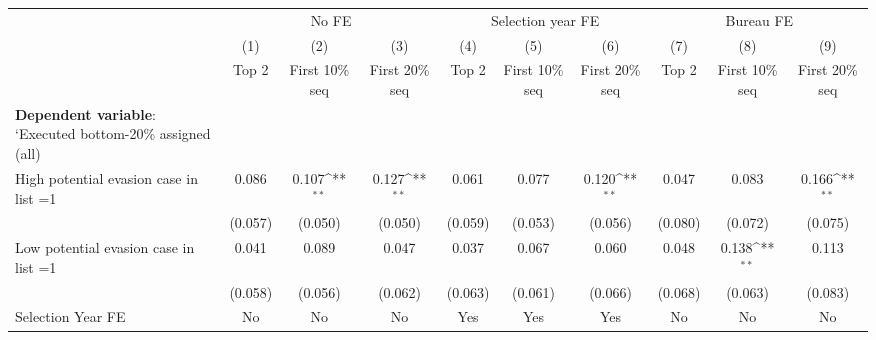 {
\def\sym#1{\ifmmode^{#1}\else\(^{#1}\)\fi}
\begin{tabular}{l*{9}{c}}
\toprule
            &\multicolumn{3}{c}{No FE}                                        &\multicolumn{3}{c}{Selection year FE}                            &\multicolumn{3}{c}{Bureau FE}                                    \\\cmidrule(lr){2-4}\cmidrule(lr){5-7}\cmidrule(lr){8-10}
            &\multicolumn{1}{c}{(1)}&\multicolumn{1}{c}{(2)}&\multicolumn{1}{c}{(3)}&\multicolumn{1}{c}{(4)}&\multicolumn{1}{c}{(5)}&\multicolumn{1}{c}{(6)}&\multicolumn{1}{c}{(7)}&\multicolumn{1}{c}{(8)}&\multicolumn{1}{c}{(9)}\\
            &\multicolumn{1}{c}{Top 2}&\multicolumn{1}{c}{First 10\% seq}&\multicolumn{1}{c}{First 20\% seq}&\multicolumn{1}{c}{Top 2}&\multicolumn{1}{c}{First 10\% seq}&\multicolumn{1}{c}{First 20\% seq}&\multicolumn{1}{c}{Top 2}&\multicolumn{1}{c}{First 10\% seq}&\multicolumn{1}{c}{First 20\% seq}\\
\midrule
\textbf{Dependent variable}: `Executed bottom-20\% \/ assigned (all)&                     &                     &                     &                     &                     &                     &                     &                     &                     \\
\addlinespace
High potential evasion case in list =1&       0.086         &       0.107\sym{**} &       0.127\sym{**} &       0.061         &       0.077         &       0.120\sym{**} &       0.047         &       0.083         &       0.166\sym{**} \\
            &     (0.057)         &     (0.050)         &     (0.050)         &     (0.059)         &     (0.053)         &     (0.056)         &     (0.080)         &     (0.072)         &     (0.075)         \\
\addlinespace
Low potential evasion case in list =1&       0.041         &       0.089         &       0.047         &       0.037         &       0.067         &       0.060         &       0.048         &       0.138\sym{**} &       0.113         \\
            &     (0.058)         &     (0.056)         &     (0.062)         &     (0.063)         &     (0.061)         &     (0.066)         &     (0.068)         &     (0.063)         &     (0.083)         \\
\midrule
Selection Year FE&          No         &          No         &          No         &         Yes         &         Yes         &         Yes         &          No         &          No         &          No         \\

\end{tabular}}
